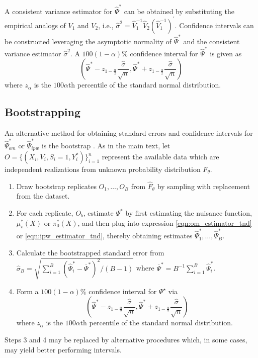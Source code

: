 \begin{appendix}
\begin{refsection}
A consistent variance estimator for $\widehat{\Psi}^*$ can be obtained by substituting the empirical analogs of $V_1$ and $V_2$, i.e., $\widehat{\sigma}^2=\widehat{V}_1^{-1} \widehat{V}_2(\widehat{V}_1^{-1})^{\prime}$. Confidence intervals can be constructed leveraging the asymptotic normality of $\widehat{\Psi}^*$ and the consistent variance estimator $\widehat{\sigma}^2$. A $100(1-\alpha) \%$ confidence interval for $\widehat{\Psi}^*$ is given as
$$
\left(\widehat{\Psi}^*-z_{1-\frac{\alpha}{2}} \frac{\widehat{\sigma}}{\sqrt{n}}, \widehat{\Psi}^*+z_{1-\frac{\alpha}{2}} \frac{\widehat{\sigma}}{\sqrt{n}}\right)
$$
where $z_\alpha$ is the $100 \alpha$th percentile of the standard normal distribution.

\subsection{Bootstrapping}
An alternative method for obtaining standard errors and confidence intervals for $\widehat{\Psi}^*_{om}$ or $\widehat{\Psi}^*_{ipw}$ is the  bootstrap \cite{diciccio_bootstrap_1987}. As in the main text, let $O = \{(X_i, V_i, S_i = 1, Y_i^*)\}_{i=1}^n$ represent the available data which are  independent realizations from unknown probability distribution $F_{\theta}$. 

\begin{enumerate}
    \item Draw bootstrap replicates $O_1, \ldots, O_B$ from $\widehat{F}_{\theta}$ by sampling with replacement from the dataset. 
    \item For each replicate, $O_b$, estimate $\Psi^*$ by first estimating the nuisance function, $\mu^*_v(X)$ or $\pi_0^*(X)$, and then plug into expression \ref{eqn:om_estimator_tnd} or \ref{eqn:ipw_estimator_tnd}, thereby obtaining estimates $\widehat{\Psi}^*_1, \ldots, \widehat{\Psi}^*_B$.
    \item Calculate the bootstrapped standard error from $\widehat{\sigma}_B = \sqrt{ \sum_{i=1}^{B} (\widehat{\Psi}^*_i - \overline{\Psi}^*)^2/(B-1)}$ where $\overline{\Psi}^* = B^{-1}\sum_{i=1}^B \widehat{\Psi}^*_i$.
    \item Form a $100(1-\alpha)\%$ confidence interval for $\Psi^{\star}$ via
    $$
    \left(\widehat{\Psi}^*-z_{1-\frac{\alpha}{2}} \frac{\widehat{\sigma}}{\sqrt{n}}, \widehat{\Psi}^*+z_{1-\frac{\alpha}{2}} \frac{\widehat{\sigma}}{\sqrt{n}}\right)
    $$
    where $z_\alpha$ is the $100 \alpha$th percentile of the standard normal distribution.
\end{enumerate}
 Steps 3 and 4 may be replaced by alternative procedures which, in some cases, may yield better performing intervals.
    \newpage


\end{refsection}
\end{appendix}
